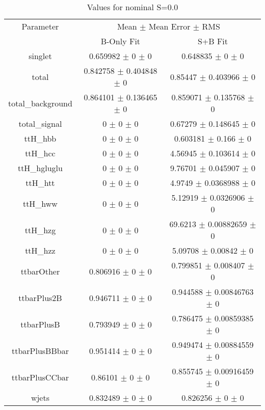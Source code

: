 \begin{table}
\centering
\caption{Values for nominal S=0.0}
\begin{tabular}{ccc}
\toprule
Parameter & \multicolumn{2}{c}{Mean $\pm$ Mean Error $\pm$ RMS}\\
 & B-Only Fit & S+B Fit\\
\midrule
singlet & \num{0.659982} $\pm$ \num{0} $\pm$ \num{0} & \num{0.648835} $\pm$ \num{0} $\pm$ \num{0}\\
total & \num{0.842758} $\pm$ \num{0.404848} $\pm$ \num{0} & \num{0.85447} $\pm$ \num{0.403966} $\pm$ \num{0}\\
total\_background & \num{0.864101} $\pm$ \num{0.136465} $\pm$ \num{0} & \num{0.859071} $\pm$ \num{0.135768} $\pm$ \num{0}\\
total\_signal & \num{0} $\pm$ \num{0} $\pm$ \num{0} & \num{0.67279} $\pm$ \num{0.148645} $\pm$ \num{0}\\
ttH\_hbb & \num{0} $\pm$ \num{0} $\pm$ \num{0} & \num{0.603181} $\pm$ \num{0.166} $\pm$ \num{0}\\
ttH\_hcc & \num{0} $\pm$ \num{0} $\pm$ \num{0} & \num{4.56945} $\pm$ \num{0.103614} $\pm$ \num{0}\\
ttH\_hgluglu & \num{0} $\pm$ \num{0} $\pm$ \num{0} & \num{9.76701} $\pm$ \num{0.045907} $\pm$ \num{0}\\
ttH\_htt & \num{0} $\pm$ \num{0} $\pm$ \num{0} & \num{4.9749} $\pm$ \num{0.0368988} $\pm$ \num{0}\\
ttH\_hww & \num{0} $\pm$ \num{0} $\pm$ \num{0} & \num{5.12919} $\pm$ \num{0.0326906} $\pm$ \num{0}\\
ttH\_hzg & \num{0} $\pm$ \num{0} $\pm$ \num{0} & \num{69.6213} $\pm$ \num{0.00882659} $\pm$ \num{0}\\
ttH\_hzz & \num{0} $\pm$ \num{0} $\pm$ \num{0} & \num{5.09708} $\pm$ \num{0.00842} $\pm$ \num{0}\\
ttbarOther & \num{0.806916} $\pm$ \num{0} $\pm$ \num{0} & \num{0.799851} $\pm$ \num{0.008407} $\pm$ \num{0}\\
ttbarPlus2B & \num{0.946711} $\pm$ \num{0} $\pm$ \num{0} & \num{0.944588} $\pm$ \num{0.00846763} $\pm$ \num{0}\\
ttbarPlusB & \num{0.793949} $\pm$ \num{0} $\pm$ \num{0} & \num{0.786475} $\pm$ \num{0.00859385} $\pm$ \num{0}\\
ttbarPlusBBbar & \num{0.951414} $\pm$ \num{0} $\pm$ \num{0} & \num{0.949474} $\pm$ \num{0.00884559} $\pm$ \num{0}\\
ttbarPlusCCbar & \num{0.86101} $\pm$ \num{0} $\pm$ \num{0} & \num{0.855745} $\pm$ \num{0.00916459} $\pm$ \num{0}\\
wjets & \num{0.832489} $\pm$ \num{0} $\pm$ \num{0} & \num{0.826256} $\pm$ \num{0} $\pm$ \num{0}\\
\bottomrule
\end{tabular}
\end{table}